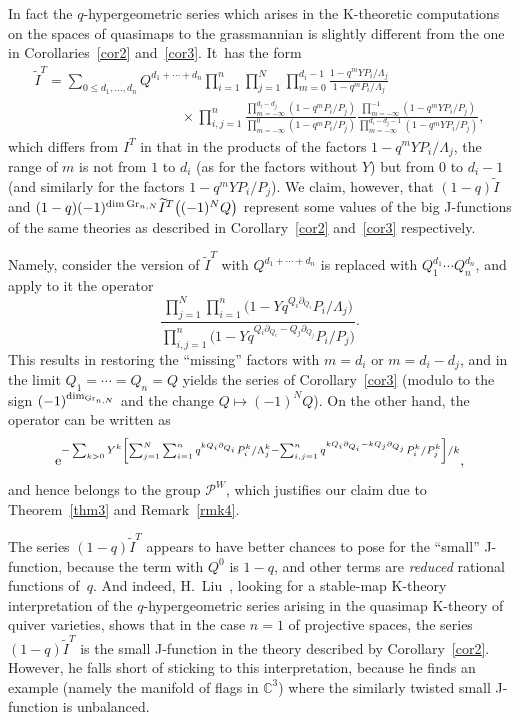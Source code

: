 \documentclass[pdftex]{sigma}
\numberwithin{equation}{section}
\def\CC{\mathbb C}
\def\tilde{\widetilde}
\def\p{\partial}
\begin{document}
In fact the $q$-hypergeometric series which arises in the K-theoretic computations on the spaces of quasimaps to the grassmannian is slightly different from the one in Corollaries~\ref{cor2} and~\ref{cor3}. It~has the form
\begin{gather*}
\tilde{I}^T = \sum_{0\leq d_1,\dots,d_n}Q^{d_1+\cdots+d_n} \prod_{i=1}^n\prod_{j=1}^N\prod_{m=0}^{d_i-1}\frac{1-q^mYP_i/\Lambda_j} {1-q^mP_i/\Lambda_j}
\\ \phantom{\tilde{I}^T =\sum_{0\leq d_1,\dots,d_n}Q^{d_1+\cdots}}
{}\times \prod_{i,j=1}^n\frac{\prod_{m=-\infty}^{d_i-d_j}(1-q^mP_i/P_j)}{\prod_{m=-\infty}^0(1-q^mP_i/P_j)}\frac{\prod_{m=-\infty}^{-1}(1-q^mY P_i/P_j)}{\prod_{m=-\infty}^{d_i-d_j-1}(1-q^mY P_i/P_j)},
\end{gather*}
which differs from $I^T$ in that in the products of the factors $1-q^mYP_i/\Lambda_j$, the range of $m$ is not from $1$ to $d_i$ (as for the factors without $Y$) but from $0$ to $d_i-1$ (and similarly for the factors $1-q^mYP_i/P_j$). We claim, however, that $(1-q) \tilde{I}$ and $(1-q) (-1)^{\dim {\rm Gr}_{n,N}} \tilde{I}^T\big((-1)^NQ\big)$ represent some values of the big J-functions of the same theories as described in Corollary~\ref{cor2} and~\ref{cor3} respectively.

Namely, consider the version of $\tilde{I}^T$ with $Q^{d_1+\cdots+d_n}$ is replaced with $Q_1^{d_1}\cdots Q_n^{d_n}$, and apply to it the operator
\[
\frac{\prod_{j=1}^N\prod_{i=1}^n\big(1-Y q^{Q_i\p_{Q_i}}P_i/\Lambda_j\big)}{\prod_{i,j=1}^n\big(1-Y q^{Q_i\p_{Q_i}-Q_j\p_{Q_j}}P_i/P_j\big)}.
\]
This results in restoring the ``missing'' factors with $m=d_i$ or $m=d_i-d_j$, and in the limit $Q_1=\cdots=Q_n=Q$ yields the series of Corollary~\ref{cor3} (modulo to the sign $(-1)^{\dim_{{\rm Gr}_{n,N}}}$ and the change $Q\mapsto (-1)^NQ$). On the other hand, the operator can be written as
\[
{\rm e}^{-\sum_{k>0} Y^k \left[\sum_{j=1}^N\sum_{i=1}^n q^{kQ_i\p_{Q_i}}P^k_i/\Lambda^k_j - \sum_{i,j=1}^n q^{kQ_i\p_{Q_i}-kQ_j\p_{Q_j}} P^k_i/P^k_j \right]/k},
\]
and hence belongs to the group ${\mathcal P}^W$, which justifies our claim due to Theorem~\ref{thm3} and Remark~\ref{rmk4}.

The series $(1-q)\tilde{I}^T$ appears to have better chances to pose for the ``small'' J-function, because the term with $Q^0$ is $1-q$, and other terms are {\em reduced} rational functions of~$q$. And indeed, H.~Liu~\cite{Liu}, looking for a stable-map K-theory interpretation of the $q$-hypergeometric series arising in the quasimap K-theory of quiver varieties, shows that in the case $n=1$ of projective spaces, the series $(1-q)\tilde{I}^T$ is the small J-function in the theory described by Corollary~\ref{cor2}. However, he falls short of sticking to this interpretation, because he finds an example (namely the manifold of flags in $\CC^3$) where the similarly twisted small J-function is unbalanced.
\end{document}
